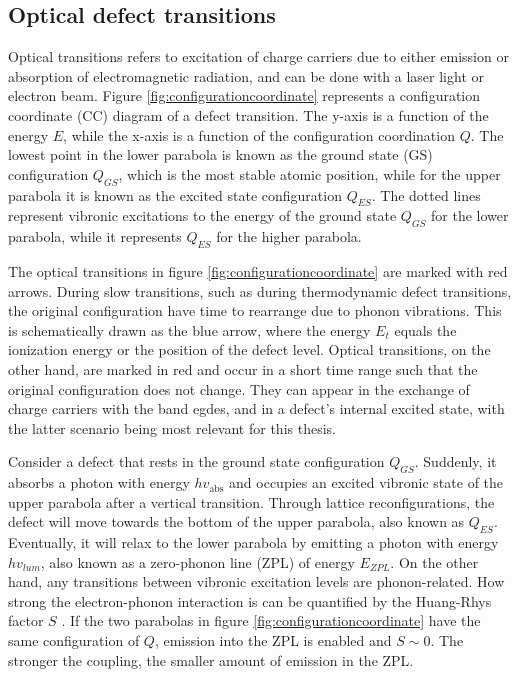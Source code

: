 \subsection{Optical defect transitions}

Optical transitions refers to excitation of charge carriers due to either emission or absorption of electromagnetic radiation, and can be done with a laser light or electron beam. Figure \ref{fig:configurationcoordinate} represents a configuration coordinate (CC) diagram of a defect transition. The y-axis is a function of the energy $E$, while the x-axis is a function of the configuration coordination $Q$. The lowest point in the lower parabola is known as the ground state (GS) configuration $Q_{GS}$, which is the most stable atomic position, while for the upper parabola it is known as the excited state configuration $Q_{ES}$. The dotted lines represent vibronic excitations to the energy of the ground state $Q_{GS}$ for the lower parabola, while it represents $Q_{ES}$ for the higher parabola.



\noindent The optical transitions in figure \ref{fig:configurationcoordinate} are marked with red arrows. During slow transitions, such as during thermodynamic defect transitions, the original configuration have time to rearrange due to phonon vibrations. This is schematically drawn as the blue arrow, where the energy $E_t$ equals the ionization energy or the position of the defect level. Optical transitions, on the other hand, are marked in red and occur in a short time range such that the original configuration does not change. They can appear in the exchange of charge carriers with the band egdes, and in a defect's internal excited state, with the latter scenario being most relevant for this thesis.

Consider a defect that rests in the ground state configuration $Q_{GS}$. Suddenly, it absorbs a photon with energy $h v_{\text{abs}}$ and occupies an excited vibronic state of the upper parabola after a vertical transition. Through lattice reconfigurations, the defect will move towards the bottom of the upper parabola, also known as $Q_{ES}$. Eventually, it will relax to the lower parabola by emitting a photon with energy $h v_{lum}$, also known as a zero-phonon line (ZPL) of energy $E_{ZPL}$. On the other hand, any transitions between vibronic excitation levels are phonon-related. How strong the electron-phonon interaction is can be quantified by the Huang-Rhys factor $S$ \cite{Huang1950}. If the two parabolas in figure \ref{fig:configurationcoordinate} have the same configuration of $Q$, emission into the ZPL is enabled and $S\sim 0$. The stronger the coupling, the smaller amount of emission in the ZPL.


